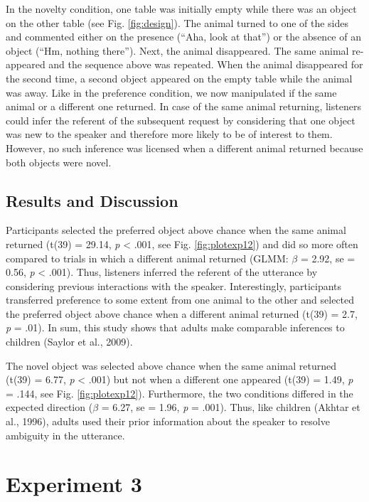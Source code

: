 \documentclass[10pt, letterpaper]{article}
\begin{document}
In the novelty condition, one table was initially empty while there was
an object on the other table (see Fig. \ref{fig:design}). The animal
turned to one of the sides and commented either on the presence (``Aha,
look at that'') or the absence of an object (``Hm, nothing there'').
Next, the animal disappeared. The same animal re-appeared and the
sequence above was repeated. When the animal disappeared for the second
time, a second object appeared on the empty table while the animal was
away. Like in the preference condition, we now manipulated if the same
animal or a different one returned. In case of the same animal
returning, listeners could infer the referent of the subsequent request
by considering that one object was new to the speaker and therefore more
likely to be of interest to them. However, no such inference was
licensed when a different animal returned because both objects were
novel.

\subsection{Results and Discussion}\label{results-and-discussion-1}

Participants selected the preferred object above chance when the same
animal returned (t(39) = 29.14, \emph{p} \textless{} .001, see Fig.
\ref{fig:plotexp12}) and did so more often compared to trials in which a
different animal returned (GLMM: \(\beta\) = 2.92, se = 0.56, \emph{p}
\textless{} .001). Thus, listeners inferred the referent of the
utterance by considering previous interactions with the speaker.
Interestingly, participants transferred preference to some extent from
one animal to the other and selected the preferred object above chance
when a different animal returned (t(39) = 2.7, \emph{p} = .01). In sum,
this study shows that adults make comparable inferences to children
(Saylor et al., 2009).

The novel object was selected above chance when the same animal returned
(t(39) = 6.77, \emph{p} \textless{} .001) but not when a different one
appeared (t(39) = 1.49, \emph{p} = .144, see Fig. \ref{fig:plotexp12}).
Furthermore, the two conditions differed in the expected direction
(\(\beta\) = 6.27, se = 1.96, \emph{p} = .001). Thus, like children
(Akhtar et al., 1996), adults used their prior information about the
speaker to resolve ambiguity in the utterance.

\section{Experiment 3}\label{experiment-3}
\end{document}
